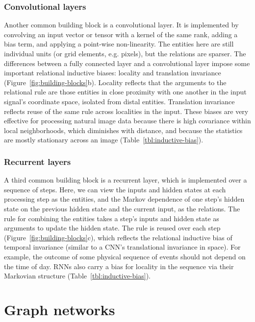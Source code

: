 \documentclass[10pt]{book}
\begin{document}
\subsubsection{Convolutional layers}

Another common building block is a convolutional layer.
It is implemented by convolving an input vector or tensor with a kernel of the same rank, adding a bias term, and applying a point-wise non-linearity.
The entities here are still individual units (or grid elements, e.g. pixels), but the relations are sparser. 
The differences between a fully connected layer and a convolutional layer impose some important relational inductive biases: locality and translation invariance (Figure~\ref{fig:building-blocks}b).
Locality reflects that the arguments to the relational rule are those entities in close proximity with one another in the input signal's coordinate space, isolated from distal entities.
Translation invariance reflects reuse of the same rule across localities in the input.
These biases are very effective for processing natural image data because there is high covariance within local neighborhoods, which diminishes with distance, and because the statistics are mostly stationary across an image (Table~\ref{tbl:inductive-bias}).

\subsubsection{Recurrent layers}

A third common building block is a recurrent layer, which is implemented over a sequence of steps.
Here, we can view the inputs and hidden states at each processing step as the entities, and the Markov dependence of one step's hidden state on the previous hidden state and the current input, as the relations.
The rule for combining the entities takes a step's inputs and hidden state as arguments to update the hidden state. The rule is reused over each step (Figure~\ref{fig:building-blocks}c), which reflects the relational inductive bias of temporal invariance (similar to a CNN's translational invariance in space). 
For example, the outcome of some physical sequence of events should not depend on the time of day.
RNNs also carry a bias for locality in the sequence via their Markovian structure (Table~\ref{tbl:inductive-bias}).

\section{Graph networks}
\label{sec:model}
\end{document}
